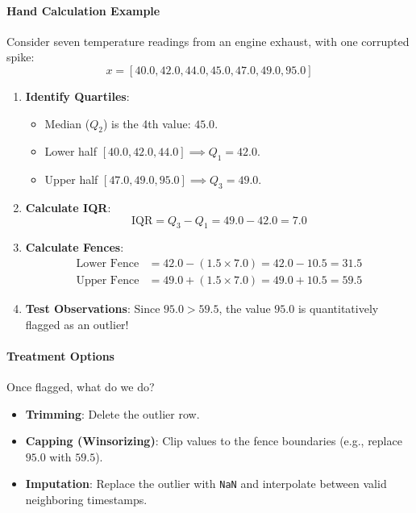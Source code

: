 \paragraph{Hand Calculation Example}
Consider seven temperature readings from an engine exhaust, with one corrupted spike:
\begin{equation*}
x = [40.0, 42.0, 44.0, 45.0, 47.0, 49.0, 95.0]
\end{equation*}
\begin{enumerate}
    \item \textbf{Identify Quartiles}:
    \begin{itemize}
        \item Median ($Q_2$) is the 4th value: $45.0$.
        \item Lower half $[40.0, 42.0, 44.0] \implies Q_1 = 42.0$.
        \item Upper half $[47.0, 49.0, 95.0] \implies Q_3 = 49.0$.
    \end{itemize}
    \item \textbf{Calculate IQR}:
    \begin{equation*}
    \text{IQR} = Q_3 - Q_1 = 49.0 - 42.0 = 7.0
    \end{equation*}
    \item \textbf{Calculate Fences}:
    \begin{align*}
    \text{Lower Fence} &= 42.0 - (1.5 \times 7.0) = 42.0 - 10.5 = 31.5 \\
    \text{Upper Fence} &= 49.0 + (1.5 \times 7.0) = 49.0 + 10.5 = 59.5
    \end{align*}
    \item \textbf{Test Observations}:
    Since $95.0 > 59.5$, the value $95.0$ is quantitatively flagged as an outlier!
\end{enumerate}

\paragraph{Treatment Options}
Once flagged, what do we do?
\begin{itemize}
    \item \textbf{Trimming}: Delete the outlier row.
    \item \textbf{Capping (Winsorizing)}: Clip values to the fence boundaries (e.g., replace $95.0$ with $59.5$).
    \item \textbf{Imputation}: Replace the outlier with \texttt{NaN} and interpolate between valid neighboring timestamps.
\end{itemize}

